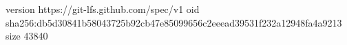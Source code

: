 version https://git-lfs.github.com/spec/v1
oid sha256:db5d30841b58043725b92cb47e85099656c2eeead39531f232a12948fa4a9213
size 43840
